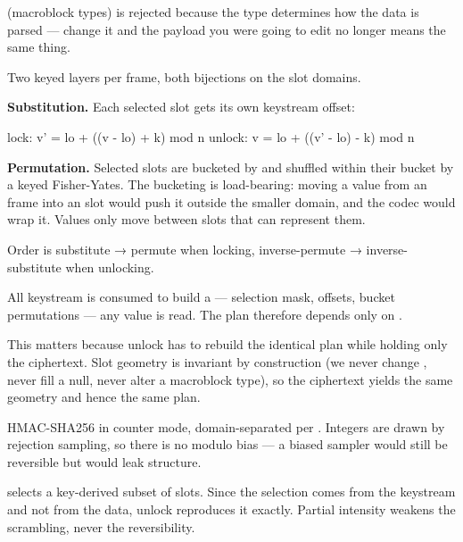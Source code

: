 \documentclass[fontpath=fonts/,logopath=logo/]{riposte-doc}
\begin{document}
 (macroblock types) is rejected because the type determines how the  data is parsed — change it and the payload you were going to edit no longer means the same thing.



Two keyed layers per frame, both bijections on the slot domains.

\textbf{Substitution.} Each selected slot gets its own keystream offset:

\ripcodeopen
{}
\begin{ripcodeblock}
lock:    v' = lo + ((v  - lo) + k) mod n
unlock:  v  = lo + ((v' - lo) - k) mod n
\end{ripcodeblock}
\ripcodesizereset\ripcodeclose

\textbf{Permutation.} Selected slots are bucketed by  and shuffled within their bucket by a keyed Fisher-Yates. The bucketing is load-bearing: moving a value from an  frame into an  slot would push it outside the smaller domain, and the codec would wrap it. Values only move between slots that can represent them.

Order is substitute → permute when locking, inverse-permute → inverse-substitute when unlocking.



All keystream is consumed to build a  — selection mask, offsets, bucket permutations —  any value is read. The plan therefore depends only on .

This matters because unlock has to rebuild the identical plan while holding only the ciphertext. Slot geometry is invariant by construction (we never change , never fill a null, never alter a macroblock type), so the ciphertext yields the same geometry and hence the same plan.



HMAC-SHA256 in counter mode, domain-separated per . Integers are drawn by rejection sampling, so there is no modulo bias — a biased sampler would still be reversible but would leak structure.

 selects a key-derived subset of slots. Since the selection comes from the keystream and not from the data, unlock reproduces it exactly. Partial intensity weakens the  scrambling, never the reversibility.
\end{document}
